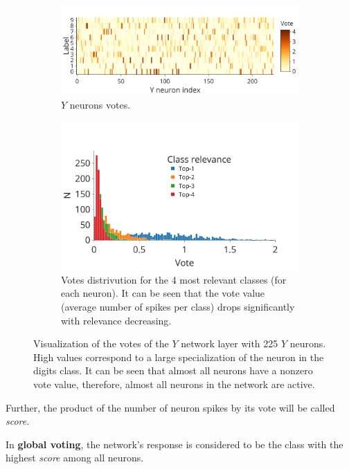 \documentclass[a4paper]{article}
\begin{document}
\begin{figure}
\centering
\begin{subfigure}{\textwidth}
    \includegraphics[width=\textwidth,keepaspectratio=true]{votes.pdf}
    \caption{$Y$ neurons votes.}
\end{subfigure}
\begin{subfigure}{\textwidth} 
    \includegraphics[width=\textwidth,keepaspectratio=true]{votes_distr_4.pdf} 
    \caption{Votes distrivution for the 4 most relevant classes (for each neuron). It can be seen that the vote value (average number of spikes per class) drops significantly with relevance decreasing.}
\end{subfigure}
\caption{Visualization of the votes of the $ Y $ network layer with 225 $ Y $ neurons. High values correspond to a large specialization of the neuron in the digits class. It can be seen that almost all neurons have a nonzero vote value, therefore, almost all neurons in the network are active.}
\label{fig:votes}
\end{figure}

Further, the product of the number of neuron spikes by its vote will be called \textit{score}.

In \textbf{global voting}, the network's response is considered to be the class with the highest \textit{score} among all neurons.
\end{document}
